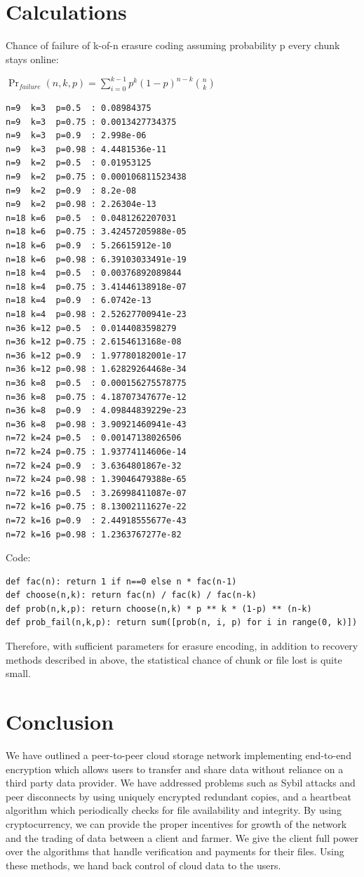 \documentclass[a4paper,10pt]{article}
\begin{document}
\section{Calculations}
Chance of failure of k-of-n erasure coding assuming probability p every chunk stays online:

{\centering
$\Pr_{failure}(n,k,p) = \displaystyle \sum_{i=0}^{k-1} p^{k}(1-p)^{n-k }{n \choose k}$
\\}


\begin{lstlisting}
n=9  k=3  p=0.5  : 0.08984375
n=9  k=3  p=0.75 : 0.0013427734375
n=9  k=3  p=0.9  : 2.998e-06
n=9  k=3  p=0.98 : 4.4481536e-11
n=9  k=2  p=0.5  : 0.01953125
n=9  k=2  p=0.75 : 0.000106811523438
n=9  k=2  p=0.9  : 8.2e-08
n=9  k=2  p=0.98 : 2.26304e-13
n=18 k=6  p=0.5  : 0.0481262207031
n=18 k=6  p=0.75 : 3.42457205988e-05
n=18 k=6  p=0.9  : 5.26615912e-10
n=18 k=6  p=0.98 : 6.39103033491e-19
n=18 k=4  p=0.5  : 0.00376892089844
n=18 k=4  p=0.75 : 3.41446138918e-07
n=18 k=4  p=0.9  : 6.0742e-13
n=18 k=4  p=0.98 : 2.52627700941e-23
n=36 k=12 p=0.5  : 0.0144083598279
n=36 k=12 p=0.75 : 2.6154613168e-08
n=36 k=12 p=0.9  : 1.97780182001e-17
n=36 k=12 p=0.98 : 1.62829264468e-34
n=36 k=8  p=0.5  : 0.000156275578775
n=36 k=8  p=0.75 : 4.18707347677e-12
n=36 k=8  p=0.9  : 4.09844839229e-23
n=36 k=8  p=0.98 : 3.90921460941e-43
n=72 k=24 p=0.5  : 0.00147138026506
n=72 k=24 p=0.75 : 1.93774114606e-14
n=72 k=24 p=0.9  : 3.6364801867e-32
n=72 k=24 p=0.98 : 1.39046479388e-65
n=72 k=16 p=0.5  : 3.26998411087e-07
n=72 k=16 p=0.75 : 8.13002111627e-22
n=72 k=16 p=0.9  : 2.44918555677e-43
n=72 k=16 p=0.98 : 1.2363767277e-82
\end{lstlisting}

Code:
\begin{lstlisting}
def fac(n): return 1 if n==0 else n * fac(n-1)
def choose(n,k): return fac(n) / fac(k) / fac(n-k) 
def prob(n,k,p): return choose(n,k) * p ** k * (1-p) ** (n-k)
def prob_fail(n,k,p): return sum([prob(n, i, p) for i in range(0, k)])
\end{lstlisting}
Therefore, with sufficient parameters for erasure encoding, in addition to recovery methods described in above, the statistical chance of chunk or file lost is quite small. 

\section{Conclusion}
We have outlined a peer-to-peer cloud storage network implementing end-to-end encryption which allows users to transfer and share data without reliance on a third party data provider. We have addressed problems such as Sybil attacks and peer disconnects by using uniquely encrypted redundant copies, and a heartbeat algorithm which periodically checks for file availability and integrity. By using cryptocurrency, we can provide the proper incentives for growth of the network and the trading of data between a client and farmer. We give the client full power over the algorithms that handle verification and payments for their files. Using these methods, we hand back control of cloud data to the users. 




\begingroup
  \raggedright
  
\endgroup
\end{document}
